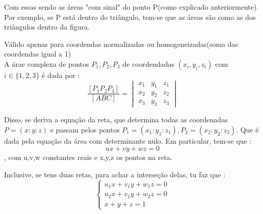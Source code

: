\documentclass{article}
\begin{document}
Com essas sendo as áreas "com sinal" do ponto P(como explicado anteriormente). Por exemplo, se P está dentro do  triângulo, tem-se que as áreas são como as dos triângulos dentro da figura. 
\begin{center}
\end{center}


\begin{tcolorbox}[colback=green!5!white,colframe=green!75!black,title=Área complexa(coordenadas homogêneas)\emoji{goblin}]
 Válido apenas para coordendas normalizadas ou homogeneizadas(soma das coordendas igual a 1) \\
A árae complexa de pontos $P_1, P_2, P_3$ de coordendadas $(x_i, y_i,  z_i)$ com $i \in \{1,2,3\}$ é dada por :
$$
\frac{[P_1 P_2 P_3]}{[ABC]} = 
\begin{vmatrix}
x_1 & y_1 & z_1\\
x_2 & y_2 & z_2 \\
x_3  & y_3 & z_3
\end{vmatrix}
$$
\end{tcolorbox}

Disso, se deriva a equação da reta, que determina todas as coordenadas $P = (x : y : z)$ e passam pelos pontos $P_1 = (x_1:y_1:z_1), P_2 = (x_2:y_2:z_2)$. Que é dada pela equação da área com determinante nulo. Em particular, tem-se que :
\\
$$ux + vy + wz = 0$$, com u,v,w constantes  reais e x,y,z os pontos na reta.

Inclusive, se tens duas retas, para achar a interseção delas, tu faz que : 
$$
\begin{cases}
u_1 x + v_1 y + w_1 z = 0  \\
u_2 x + v_1 y + w_2 z = 0  \\
x + y + z = 1
\end{cases}
$$
\end{document}
